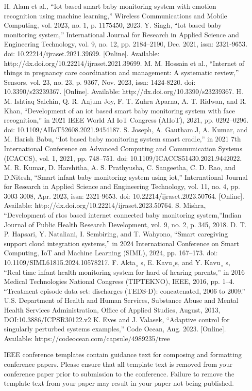 \documentclass[conference]{IEEEtran}
\begin{document}
\begin{thebibliography}{00}
 H. Alam et al., “Iot based smart baby monitoring system with emotion recognition using machine learning,” Wireless Communications and Mobile Computing, vol. 2023, no. 1, p. 1175450, 2023.
 Y. Singh, “Iot based baby monitoring system,” International  Journal for Research in Applied Science and Engineering Technology, vol. 9, no. 12, pp. 2184–2190, Dec. 2021, issn: 2321-9653. doi: 10.22214/ijraset.2021.39699. [Online]. Available: http://dx.doi.org/10.22214/ijraset.2021.39699.
 M. M. Hossain et al., “Internet of things in pregnancy care coordination and management: A systematic review,” Sensors, vol. 23, no. 23, p. 9367, Nov. 2023, issn: 1424-8220. doi: 10.3390/s23239367. [Online]. Available: http://dx.doi.org/10.3390/s23239367.
 H. M. Ishtiaq Salehin, Q. R. Anjum Joy, F. T. Zuhra Aparna, A. T. Ridwan, and R. Khan, “Development of an iot based smart baby monitoring system with face recognition,” in 2021 IEEE World AI IoT Congress (AIIoT), 2021, pp. 0292–0296. doi: 10.1109/AIIoT52608.2021.9454187.
 S. Joseph, A. Gautham.J, A. Kumar, and M. Harish Babu, “Iot based baby monitoring system smart cradle,” in 2021 7th International Conference on Advanced Computing and Communication Systems (ICACCS), vol. 1, 2021, pp. 748–751. doi: 10.1109/ICACCS51430.2021.9442022.
 M. R. Kumar, D. Harshitha, A. S. Prathyusha, C. Sangeetha, C. D. Rao, and D.Nitesh, “Smart infant baby monitoring system using iot,” International Journal for Research in Applied Science and Engineering Technology, vol. 11, no. 4, pp. 3003 3008, Apr. 2023, issn: 2321-9653. doi: 10.22214/ijraset.2023.50764. [Online]. Available: http://dx.doi.org/10.22214/ijraset.2023.50764.
  S. Mishra, “Development of rtos based internet connected baby monitoring system,”Indian Journal of Public Health Research Development, vol. 9, no. 2, p. 345, 2018.
 D. T. P. Hapsari, Y. Nataliani, I. Sembiring, and T. Wahyono, “Smart caregiving support cloud integration systems,” in 2024 International Conference on Smart Computing, IoT and Machine Learning (SIML), 2024, pp. 167–173. doi: 10.1109/SIML61815.2024.10578217.
  F. Akta¸ s, E. Kavu¸s, and Y. Kavu¸ s, “Real time infant health monitoring system for hard of hearing parents,” in 2016 Medical Technologies National Congress (TIPTEKNO), IEEE, 2016, pp. 1–4.
 ``Treatment episode data set: discharges (TEDS-D): concatenated, 2006 to 2009.'' U.S. Department of Health and Human Services, Substance Abuse and Mental Health Services Administration, Office of Applied Studies, August, 2013, DOI:10.3886/ICPSR30122.v2
 K. Eves and J. Valasek, ``Adaptive control for singularly perturbed systems examples,'' Code Ocean, Aug. 2023. [Online]. Available: https://codeocean.com/capsule/4989235/tree
\end{thebibliography}

\vspace{12pt}
\color{red}
IEEE conference templates contain guidance text for composing and formatting conference papers. Please ensure that all template text is removed from your conference paper prior to submission to the conference. Failure to remove the template text from your paper may result in your paper not being published.
\end{document}
